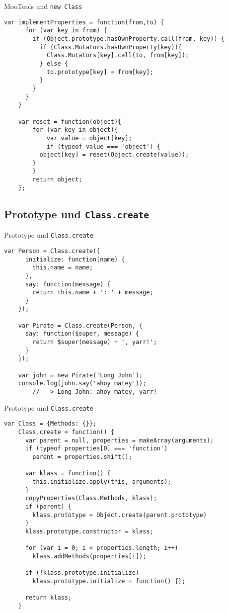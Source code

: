 \begin{frame}[fragile]{MooTools und \texttt{new Class}}
  \begin{lstlisting}[gobble=4]
    var implementProperties = function(from,to) {
      for (var key in from) {
        if (Object.prototype.hasOwnProperty.call(from, key)) {
          if (Class.Mutators.hasOwnProperty(key)){
            Class.Mutators[key].call(to, from[key]);
          } else {
            to.prototype[key] = from[key];
          }
        }
      }
    }
    
    var reset = function(object){
    	for (var key in object){
    		var value = object[key]; 
    		if (typeof value === 'object') {
          object[key] = reset(Object.create(value));
        }
    	}
    	return object;
    };
  \end{lstlisting}
\end{frame}

\subsection{Prototype und \texttt{Class.create}}

\begin{frame}[fragile]{Prototype und \texttt{Class.create}}
  \begin{lstlisting}[gobble=4]
    var Person = Class.create({
      initialize: function(name) {
        this.name = name;
      },
      say: function(message) {
        return this.name + ': ' + message;
      }
    });
    
    var Pirate = Class.create(Person, {
      say: function($super, message) {
        return $super(message) + ', yarr!';
      }
    });
    
    var john = new Pirate('Long John');
    console.log(john.say('ahoy matey'));
        // --> Long John: ahoy matey, yarr!
  \end{lstlisting}
\end{frame}

\begin{frame}[fragile]{Prototype und \texttt{Class.create}}
  \begin{lstlisting}[gobble=4]
    var Class = {Methods: {}};
    Class.create = function() {
      var parent = null, properties = makeArray(arguments);
      if (typeof properties[0] === 'function')
        parent = properties.shift();
  
      var klass = function() {
        this.initialize.apply(this, arguments);
      }  
      copyProperties(Class.Methods, klass);
      if (parent) {
        klass.prototype = Object.create(parent.prototype)
      }
      klass.prototype.constructor = klass;
  
      for (var i = 0; i < properties.length; i++)
        klass.addMethods(properties[i]);
  
      if (!klass.prototype.initialize)
        klass.prototype.initialize = function() {};
  
      return klass;
    }
  \end{lstlisting}
\end{frame}

